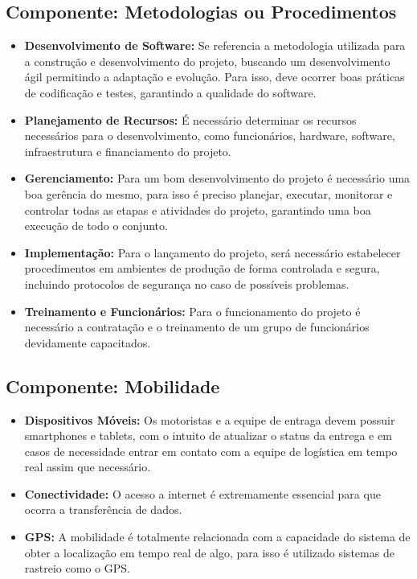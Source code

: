      \subsection{Componente: Metodologias ou Procedimentos}
     \begin{itemize}
     	\item \textbf{Desenvolvimento de Software:} Se referencia a metodologia utilizada para a construção e desenvolvimento do projeto, buscando um desenvolvimento ágil permitindo a adaptação e evolução. Para isso, deve ocorrer boas práticas de codificação e testes, garantindo a qualidade do software. 
     	
     	\item \textbf{Planejamento de Recursos:} É necessário determinar os recursos necessários para o desenvolvimento, como funcionários, hardware, software, infraestrutura e financiamento do projeto.
     	
     	\item \textbf{Gerenciamento:} Para um bom desenvolvimento do projeto é necessário uma boa gerência do mesmo, para isso é preciso planejar, executar, monitorar e controlar todas as etapas e atividades do projeto, garantindo uma boa execução de todo o conjunto. 
     	
     	\item \textbf{Implementação:} Para o lançamento do projeto, será necessário estabelecer procedimentos em ambientes de produção de forma controlada e segura, incluindo protocolos de segurança no caso de possíveis problemas.
     	
     	\item \textbf{Treinamento e Funcionários:} Para o funcionamento do projeto é necessário a contratação e o treinamento de um grupo de funcionários devidamente capacitados. 
     \end{itemize}
     

     \subsection{Componente: Mobilidade}
     \begin{itemize}
     	\item \textbf{Dispositivos Móveis:} Os motoristas e a equipe de entraga devem possuir smartphones e tablets, com o intuito de atualizar o status da entrega e em casos de necessidade entrar em contato com a equipe de logística em tempo real assim que necessário.
     	
     	\item \textbf{Conectividade:} O acesso a internet é extremamente essencial para que ocorra a transferência de dados.
     	
     	\item \textbf{GPS:} A  mobilidade é totalmente relacionada com a capacidade do sistema de obter a localização em tempo real de algo, para isso é utilizado sistemas de rastreio como o GPS. 
     \end{itemize}


